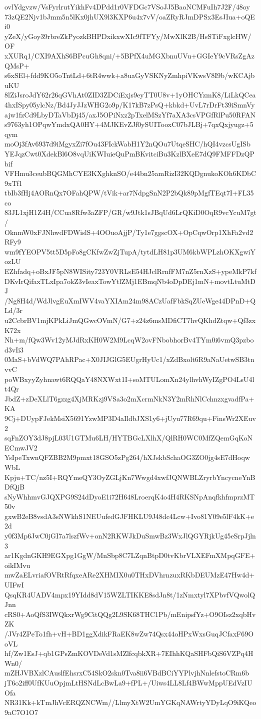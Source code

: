 ovlYdgvzw/VsFyrlrutYikhFv4DPdd1r0VFDGc7VSoJJ5BaoNCMFuIh7J2F/48oy
73zQE2Njv1bJmm5n5lKx0jhUX9l3KXP6u4x7vV/oaZRyRJmDPSx3EsJIua+oQEi0
yZeX/yGoy39rbreZkPyozkBHPDxikxwXIc9fTFYy/MwXlK2B/HsSTiFxglcHW/OF
xXURq1/CXI9AXhS6BPcuGh8qni/+5BPfX4uMGXbnuUVu+GGIeY9cVRsZgAzQMsP+
s6xSEl+fdd9KO5oTntLd+6tR4wwk+a8uaGyVSKNyZmhpiVKwsV8I9b/wKCAjbuKU
8lZiJsroJdY62r26qGVhAt0ZID3ZDCiExjs9eyTT0U8v+1yOHCYzmK8/LiLkQCea
4hxISpy05ylcNz/Bd4JyJJzWHG2o9p/K17kB7zPsQ+kbkd+UvL7rDrFt39iSmnVy
ajw1fzCd9LbyDTaVbDj45/axJ5OPiNxz2pTxelMSzYf7aXA3csVPGfRlPu50RFAN
s9763yh1OPqwYmdxQA0HY+4MJKEvZJf0ySUITooxC07bJLBj+7qxQxjyugz+5qym
moOj3fAv6937d9iMgyxZi7fOu43FIckWabH1Y2nQOu7UtqeSHC/hQI4vzcsUgISb
YEJqzCwt0XdekBl6O8vqUiKWIuieQuPmBKvitciBu3KzlBXeE7dQ9FMFFDzQPbif
VFHmu3ceubBQGMhCYE3KXghknSO/e44bn25amRizI32KQDgnukoKOh6KDbC9xTf1
tbIb3fHj4AORnQx7OFahQPW/tVik+ar7NdpgSnN2P2bQk89pMgfTEqt7I+FL35co
83JL1xjH1Z4H/CCua8Rfw3aZFP/GR/w9Jtk1sJBqUd6LrQKiD0OqR9vcYcuM7gt/
OknmW0xFJNhwdFDWislS+4OOuoAjjP/Ty1e7ggscOX+OpCqwOrp1XhFa2vd2RFy9
wm9fYEOPV5tt5D5pFo8gCKfwZwZjTupA/tytdLH81p3UM6kbWPLzhOKXgwiYozLU
EZhfadq+oBxJF5pN8WISity723Y0VRLsE54HJclRrnfFM7nZ5rnXzS+ypeMkP7kf
DKvIrQifaxTLxIpa7okZ3vIeaxTowYtlZMj1EBmqNb4oDpDEj1mN+movtLtuMtDJ
/Ng8H4d/WdJlvgEuXmIWV4vaYXIAm24m98ACzUafFbkSqZUeWge44DPnD+QLd/3r
u2CcbrBV1mjKPkLiJmQGwcOVmN/G7+z24z6msMDfiCT7hvQKhdZtqw+Qf3zxK72x
Nh+m/fQw3Wv12yMJdRxKH0W2M9LcqW2ovFNbobhorBv4TYm0i6vmQ3pzbod3vIi3
0MaS+bVdWQ7PAhRPac+X0JIJGlG5EUgrHyUc1/xZdBxolt6R9aNaUetwSB3tnvvC
poWBxyyZyhnawt6RQQaY48NXWxt1I+soMTULomXn24ylhvhWyIZgPO4LsU4lt4Qr
JbdZ+zDeXLlT6gzzg4XjMRKzj9VSa3o2mXcrmNkN3Y2mRhNlCchnzxgvadfPa+KA
9Cj+DUypFJekMsiX5691YzwMP3D4aIldbJXS1y6+jUyu77R69qu+FinsWr2XEuv2
sqFnZOY3dJ8pjL03U1GTMu6LH/HYTBGcLXlhX/QlRH0WC0MfZQemGqKoNECmwJV2
YsIpeTxwnQFZBB2M9pmxt18GSO5zPg264/hXJskbSchaOG3ZO0jg4sE7dHoqwWbL
Kpju+TC/nz5I+RQYmeQY3OyZGLjKn7Wwgd4xwfJQNWBLZryrbYncycneYnBDfQjB
sNyWhhmvGJQXPG9S24dDyoE1i72H648LroerqK4o4H4RKSNpAnqfkhfmprzMT50v
gxwB2eB8vsdA3sNWkhS1NEUufedGJFHKLU9J48dc4Lcw+Ivo81Y09e5lF4kK+e2d
y0f3Mp6JwC0jGI7a7lszfWv+onN2RKWJkDuSmwBz3WxJlQGYRjkUg45eSrpJjln3
ar1KgdnGKH9EGXpg1GgW/MnSbp8C7LZqnBtpD0tvKbrVLXEFmXMpqGFE+oikIMvu
mwZaELvriafOVRtRfqxeARe2XHMIX0u0THxDVhrnzuxRKbDEUMzE47Hw4d+UIFwI
QsqKR4UADV4mpx19YIdd8dV15WZLTIKKE8sdJn8t/1zNmxtyl7XPbvfVQwolQJnn
cRS0+AoQfS3IWQkxrWg9CitQQg2L9SK68THC1Pb/mEnipsfYz+O9OIsz2xqbHvZK
/JVr4ZPeTo1fh+vH+BD1ggXdikFRaEK8wZw74Qsx44oHPxWxsGuqJCfaxF69OoVL
hf/Zw1EsJ+qb1GPsZmKOVDeVd1sMZlfcqbkXR+7EIhhKQaSHFbQiS6VZPq4HWn0/
mZHJVBXzlCAuslfEhsrxC54SkO2skn0Tva8ii6VBdBCiYYPlvjhNnlefstoCRm6b
jT6o2iff0UfKUuOpjmLtHSNdLcBwLa9+fPL+/Uiws4LL8Lf4BWwMppUEdVzIUOfa
NR31Kk+kTmJhVcERQZNCWm//LlmyXtW2UmYGKqNAWrtyYDyLqO9iKQeo9aC7O1O7
